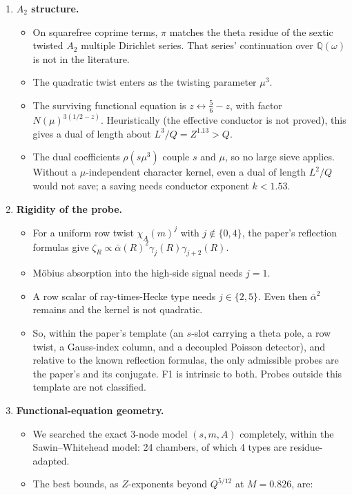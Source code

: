 \documentclass[11pt]{article}
\theoremstyle{definition}
\theoremstyle{remark}
\newcommand{\Q}{\mathbb{Q}}
\begin{document}
\begin{enumerate}[leftmargin=*]
\item \textbf{$A_2$ structure.}
  \begin{itemize}[leftmargin=*]
  \item On squarefree coprime terms, $\pi$ matches the theta residue of the sextic twisted $A_2$ multiple Dirichlet series. That series' continuation over $\Q(\omega)$ is not in the literature.
  \item The quadratic twist enters as the twisting parameter $\mu^3$.
  \item The surviving functional equation is $z\leftrightarrow\frac56-z$, with factor $N(\mu)^{3(1/2-z)}$. Heuristically (the effective conductor is not proved), this gives a dual of length about $L^3/Q=Z^{1.13}>Q$.
  \item The dual coefficients $\rho(s\mu^3)$ couple $s$ and $\mu$, so no large sieve applies. Without a $\mu$-independent character kernel, even a dual of length $L^2/Q$ would not save; a saving needs conductor exponent $k<1.53$.
  \end{itemize}
\item \textbf{Rigidity of the probe.}
  \begin{itemize}[leftmargin=*]
  \item For a uniform row twist $\chi_A(m)^j$ with $j\notin\{0,4\}$, the paper's reflection formulas give $\zeta_R\propto\bar\alpha(R)^2\gamma_j(R)\gamma_{j+2}(R)$.
  \item M\"obius absorption into the high-side signal needs $j=1$.
  \item A row scalar of ray-times-Hecke type needs $j\in\{2,5\}$. Even then $\bar\alpha^2$ remains and the kernel is not quadratic.
  \item So, within the paper's template (an $s$-slot carrying a theta pole, a row twist, a Gauss-index column, and a decoupled Poisson detector), and relative to the known reflection formulas, the only admissible probes are the paper's and its conjugate. F1 is intrinsic to both. Probes outside this template are not classified.
  \end{itemize}
\item \textbf{Functional-equation geometry.}
  \begin{itemize}[leftmargin=*]
  \item We searched the exact 3-node model $(s,m,A)$ completely, within the Sawin--Whitehead model: 24 chambers, of which 4 types are residue-adapted.
  \item The best bounds, as $Z$-exponents beyond $Q^{5/12}$ at $M=0.826$, are:

\end{itemize}
\end{enumerate}
\end{document}
